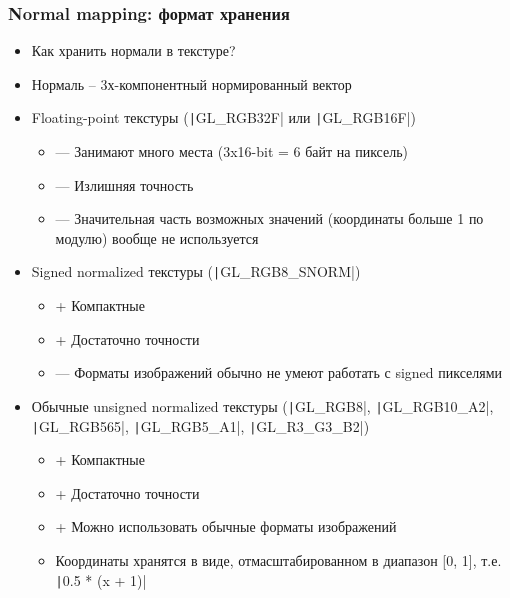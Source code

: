\documentclass[10pt]{beamer}
\begin{document}
\begin{frame}[fragile]
\frametitle{Normal mapping: формат хранения}
\fontsize{10pt}{10pt}
\begin{itemize}
\item Как хранить нормали в текстуре?
\pause
\item Нормаль -- 3х-компонентный нормированный вектор
\pause
\item Floating-point текстуры (\texttt|GL_RGB32F| или \texttt|GL_RGB16F|)
\begin{itemize}
\item {\color{red}—} Занимают много места (3x16-bit = 6 байт на пиксель)
\item {\color{red}—} Излишняя точность
\item {\color{red}—} Значительная часть возможных значений (координаты больше 1 по модулю) вообще не используется
\end{itemize}
\pause
\item Signed normalized текстуры (\texttt|GL_RGB8_SNORM|)
\begin{itemize}
\item {\color{green}+} Компактные
\item {\color{green}+} Достаточно точности
\item {\color{red}—} Форматы изображений обычно не умеют работать с signed пикселями
\end{itemize}
\pause
\item Обычные unsigned normalized текстуры (\texttt|GL_RGB8|, \texttt|GL_RGB10_A2|, \texttt|GL_RGB565|, \texttt|GL_RGB5_A1|, \texttt|GL_R3_G3_B2|)
\begin{itemize}
\item {\color{green}+} Компактные
\item {\color{green}+} Достаточно точности
\item {\color{green}+} Можно использовать обычные форматы изображений
\item Координаты хранятся в виде, отмасштабированном в диапазон [0, 1], т.е. \texttt|0.5 * (x + 1)|
\end{itemize}
\end{itemize}
\end{frame}
\end{document}
